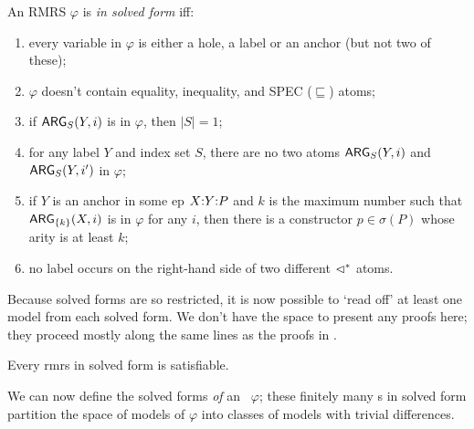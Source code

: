 \begin{definition}\label{defn:solved-forms}
  An RMRS $\varphi$ is \emph{in solved form} iff:
  \begin{enumerate}
  \item every variable in $\varphi$ is either a hole, a label or an
    anchor (but not two of these);
  \item $\varphi$ doesn't contain equality, inequality, and SPEC
    ($\sqsubseteq$) atoms;
  \item if $\mathsf{ARG}_S(Y,i)$ is in $\varphi$, then $|S| = 1$;
  \item for any label $Y$ and index set $S$, there
    are no two atoms $\mathsf{ARG}_S(Y,i)$ and $\mathsf{ARG}_S(Y,i')$ in $\varphi$;
  \item if $Y$ is an anchor in some {\sc ep} $X {:} Y {:} P$ and $k$ is the
    maximum number such that $\mathsf{ARG}_{\{k\}}(X,i)$ is in $\varphi$ for
    any $i$, then there is a constructor $p \in \sigma(P)$ whose arity
    is at least $k$;
  \item no label occurs on the right-hand side of two
    different $\lhd^*$ atoms.
  \end{enumerate}
\end{definition}

Because solved forms are so restricted, it is now possible to `read
off' at least one model from each solved form.  We don't have the
space to present any proofs here; they proceed mostly along the same
lines as the proofs in .

\begin{prop} \label{prop:solved-forms-are-satisfiable}
  Every {\sc rmrs} in solved form is satisfiable.
\end{prop}


We can now define the solved forms \emph{of} an \rmrs\ $\varphi$;
these finitely many \rmrs s in solved form partition the space of
models of $\varphi$ into classes of models with trivial differences.

